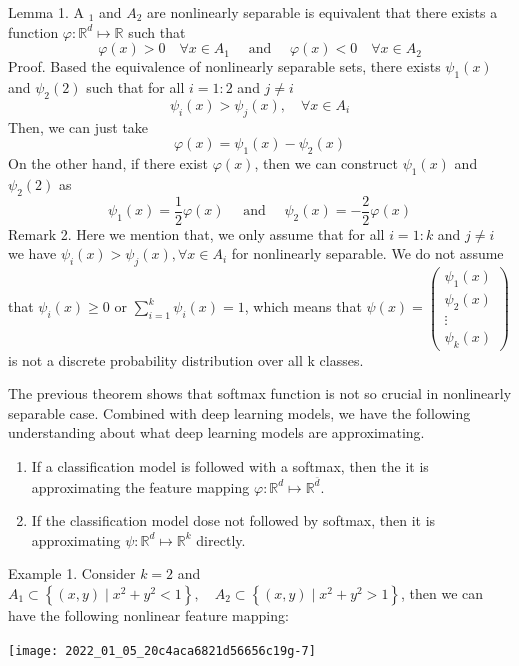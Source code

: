 \documentclass[10pt]{article}
\begin{document}
Lemma 1. A $_{1}$ and $A_{2}$ are nonlinearly separable is equivalent that there exists a function $\varphi: \mathbb{R}^{d} \mapsto \mathbb{R}$ such that
$$
\varphi(x)>0 \quad \forall x \in A_{1} \quad \text { and } \quad \varphi(x)<0 \quad \forall x \in A_{2}
$$
Proof. Based the equivalence of nonlinearly separable sets, there exists $\psi_{1}(x)$ and $\psi_{2}(2)$ such that for all $i=1: 2$ and $j \neq i$
$$
\psi_{i}(x)>\psi_{j}(x), \quad \forall x \in A_{i}
$$
Then, we can just take
$$
\varphi(x)=\psi_{1}(x)-\psi_{2}(x)
$$
On the other hand, if there exist $\varphi(x)$, then we can construct $\psi_{1}(x)$ and $\psi_{2}(2)$ as
$$
\psi_{1}(x)=\frac{1}{2} \varphi(x) \quad \text { and } \quad \psi_{2}(x)=-\frac{2}{2} \varphi(x)
$$
Remark 2. Here we mention that, we only assume that for all $i=1: k$ and $j \neq i$ we have $\psi_{i}(x)>\psi_{j}(x), \forall x \in A_{i}$ for nonlinearly separable. We do not assume that $\psi_{i}(x) \geq 0$ or $\sum_{i=1}^{k} \psi_{i}(x)=1$, which means that $\psi(x)=\left(\begin{array}{c}\psi_{1}(x) \\ \psi_{2}(x) \\ \vdots \\ \psi_{k}(x)\end{array}\right)$ is not a discrete probability distribution over all k classes.

The previous theorem shows that softmax function is not so crucial in nonlinearly separable case. Combined with deep learning models, we have the following understanding about what deep learning models are approximating.

  \begin{enumerate}
    \item If a classification model is followed with a softmax, then the it is approximating the feature mapping $\varphi: \mathbb{R}^{d} \mapsto \mathbb{R}^{\bar{d}}$.

    \item If the classification model dose not followed by softmax, then it is approximating $\psi: \mathbb{R}^{d} \mapsto \mathbb{R}^{k}$ directly.

  \end{enumerate}
Example 1. Consider $k=2$ and $A_{1} \subset\left\{(x, y) \mid x^{2}+y^{2}<1\right\}, \quad A_{2} \subset\left\{(x, y) \mid x^{2}+y^{2}>1\right\}$, then we can have the following nonlinear feature mapping:

\texttt{[image: 2022\_01\_05\_20c4aca6821d56656c19g-7]}
\end{document}
